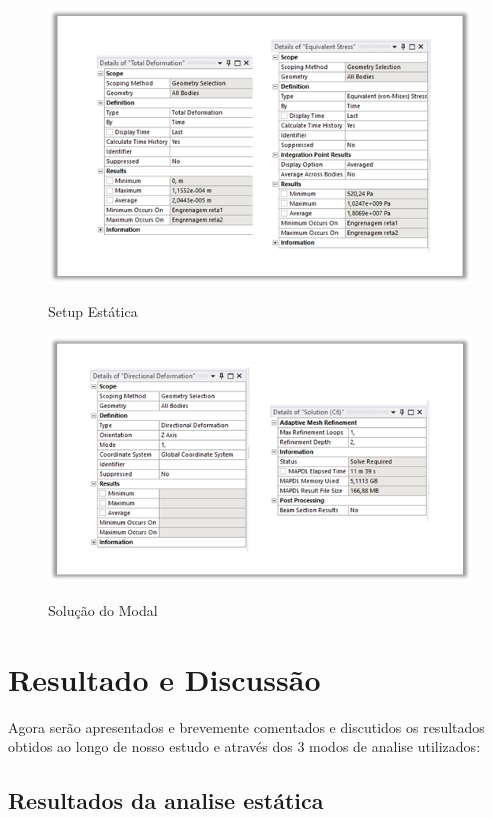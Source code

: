 \documentclass[deposito, acronym, symbols]{fei}
\begin{document}
\begin{figure}[!htb]
 \centering
    \caption{Setup Estática}
    \includegraphics[width=1\linewidth]{Imagens/solução estatica.png}
    \label{fig: Setup do Workbench}
 \end{figure}
\begin{figure}[!htb]
  
 \centering
    \caption{Solução do Modal}
    \includegraphics[width=1\linewidth]{Imagens/solução modal.png}
    \label{fig: Setup do Workbench}
 \end{figure}
 
\chapter{Resultado e Discussão}
 Agora serão apresentados e brevemente comentados e discutidos os resultados obtidos ao longo de nosso estudo e através dos 3 modos de analise utilizados: 
 \section{Resultados da analise estática}
 
\end{document}
